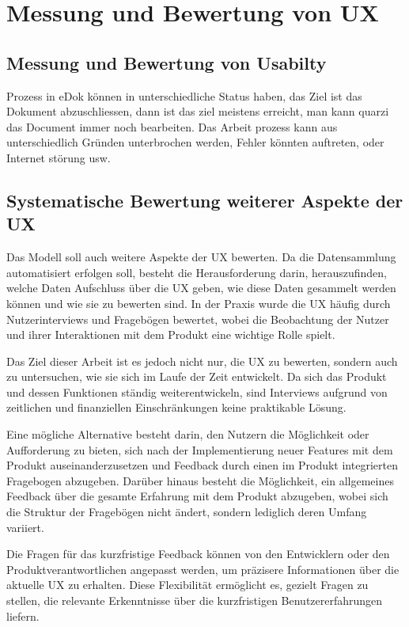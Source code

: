 \documentclass[12pt,oneside]{article}
\begin{document}
\section{Messung und Bewertung von UX}

\subsection{Messung und Bewertung von Usabilty}
Prozess in eDok können in unterschiedliche Status haben, das Ziel ist das Dokument abzuschliessen, dann ist das ziel meistens erreicht, man kann quarzi das Document immer noch bearbeiten.
Das Arbeit prozess kann aus unterschiedlich Gründen unterbrochen werden, Fehler könnten auftreten, oder  Internet störung usw.

\subsection{Systematische Bewertung weiterer Aspekte der UX} Das Modell soll auch weitere Aspekte der UX bewerten. Da die Datensammlung automatisiert erfolgen soll, besteht die Herausforderung darin, herauszufinden, welche Daten Aufschluss über die UX geben, wie diese Daten gesammelt werden können und wie sie zu bewerten sind. In der Praxis wurde die UX häufig durch Nutzerinterviews und Fragebögen bewertet, wobei die Beobachtung der Nutzer und ihrer Interaktionen mit dem Produkt eine wichtige Rolle spielt.

Das Ziel dieser Arbeit ist es jedoch nicht nur, die UX zu bewerten, sondern auch zu untersuchen, wie sie sich im Laufe der Zeit entwickelt. Da sich das Produkt und dessen Funktionen ständig weiterentwickeln, sind Interviews aufgrund von zeitlichen und finanziellen Einschränkungen keine praktikable Lösung.

Eine mögliche Alternative besteht darin, den Nutzern die Möglichkeit oder Aufforderung zu bieten, sich nach der Implementierung neuer Features mit dem Produkt auseinanderzusetzen und Feedback durch einen im Produkt integrierten Fragebogen abzugeben. Darüber hinaus besteht die Möglichkeit, ein allgemeines Feedback über die gesamte Erfahrung mit dem Produkt abzugeben, wobei sich die Struktur der Fragebögen nicht ändert, sondern lediglich deren Umfang variiert.

Die Fragen für das kurzfristige Feedback können von den Entwicklern oder den Produktverantwortlichen angepasst werden, um präzisere Informationen über die aktuelle UX zu erhalten. Diese Flexibilität ermöglicht es, gezielt Fragen zu stellen, die relevante Erkenntnisse über die kurzfristigen Benutzererfahrungen liefern.
\end{document}
